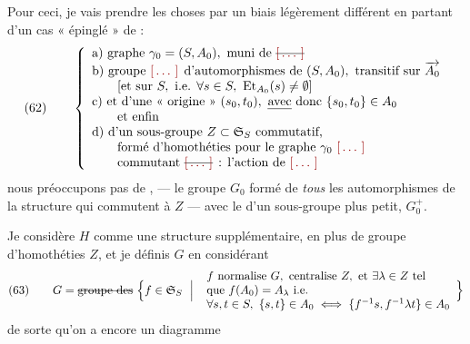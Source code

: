 \documentclass[11pt,a4paper]{article}
\begin{document}
Pour ceci,  \struck{\ill{}} je vais prendre les choses par un biais légèrement différent en partant d'un cas « épinglé »  de  :
\[
(62) \qquad
\left\{
\begin{array}{l}
\text{a) graphe } \gamma_0 = (S, A_0), \text{ muni de \struck{\ill{}}} \\
\text{b) groupe \ill{} d'automorphismes de } (S, A_0), \text{ transitif sur } \overrightarrow{A_0} \\
\qquad \text{[et sur } S, \text{ i.e. } \forall s \in S,\ \mathrm{Et}_{A_0}(s) \neq \emptyset] \\
\text{c) et d'une « origine » } (s_0, t_0), \text{ \uncertain{avec} donc } \{s_0, t_0\} \in A_0 \\
\qquad \text{et enfin} \\
\text{d) d'un sous-groupe } Z \subset \mathfrak{S}_S \text{ commutatif,} \\
\qquad \text{formé d'homothéties pour le graphe } \gamma_0 \ \text{\ill{}} \\
\qquad \text{commutant \struck{\ill{}} : l'action de \ill{}}
\end{array}
\right.
\]
 nous préoccupons pas    de \ill{} , \ill{} ---  le groupe $G_0$ formé de \emph{tous} les automorphismes  de la structure qui commutent à $Z$ ---        avec le  d'un sous-groupe plus petit, $G_0^{+}$. 

Je considère  $H$ comme une structure supplémentaire, en plus de  groupe d'homothéties $Z$, et je définis $G$ en considérant
\[
(63) \qquad G = \text{\struck{groupe des}}\ \Bigl\{ f \in \mathfrak{S}_S \ \Bigm|\ 
\begin{array}{l}
f \text{ normalise } G, \text{ centralise } Z, \text{ et } \exists \lambda \in Z \text{ tel} \\
\text{que } f(A_0) = A_{\lambda} \text{ i.e.} \\
\forall s, t \in S, \ \{s,t\} \in A_0 \iff \{f^{-1}s, f^{-1}\lambda t\} \in A_0
\end{array}
\Bigr\}
\]
de sorte qu'on a encore un diagramme
\end{document}
